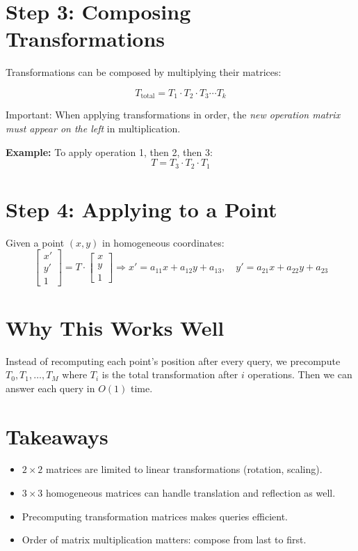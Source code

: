 \documentclass[12pt]{article}
\begin{document}
\section*{Step 3: Composing Transformations}
Transformations can be composed by multiplying their matrices:

\[
T_{\text{total}} = T_1 \cdot T_2 \cdot T_3 \cdots T_k
\]

Important: When applying transformations in order, the \emph{new operation matrix must appear on the left} in multiplication.

\textbf{Example:} To apply operation 1, then 2, then 3:
\[
T = T_3 \cdot T_2 \cdot T_1
\]

\section*{Step 4: Applying to a Point}
Given a point $(x, y)$ in homogeneous coordinates:
\[
\begin{bmatrix}
x' \\
y' \\
1
\end{bmatrix}
=
T \cdot 
\begin{bmatrix}
x \\
y \\
1
\end{bmatrix}
\Rightarrow
x' = a_{11}x + a_{12}y + a_{13}, \quad
y' = a_{21}x + a_{22}y + a_{23}
\]

\section*{Why This Works Well}
Instead of recomputing each point's position after every query, we precompute $T_0, T_1, \ldots, T_M$ where $T_i$ is the total transformation after $i$ operations. Then we can answer each query in $O(1)$ time.

\section*{Takeaways}
\begin{itemize}
    \item $2 \times 2$ matrices are limited to linear transformations (rotation, scaling).
    \item $3 \times 3$ homogeneous matrices can handle translation and reflection as well.
    \item Precomputing transformation matrices makes queries efficient.
    \item Order of matrix multiplication matters: compose from last to first.
\end{itemize}
\end{document}
